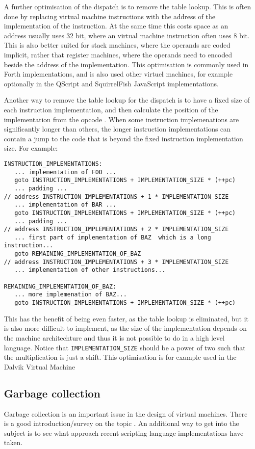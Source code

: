 \documentclass[11pt]{report}
\begin{document}
A further optimisation of the dispatch is to remove the table lookup. This is often done by replacing virtual machine instructions with the address of the implementation of the instruction. At the same time this costs space as an address usually uses 32 bit, where an virtual machine instruction often uses 8 bit. This is also better suited for stack machines, where the operands are coded implicit, rather that register machines, where the operands need to encoded beside the address of the implementation. This optimisation is commonly used in Forth implementations, and is also used other virtuel machines, for example optionally in the QScript \cite{qscript} and SquirrelFish \cite{webkit-source} JavaScript implementations.

Another way to remove the table lookup for the dispatch is to have a fixed size of each instruction implementation, and then calculate the position of the implementation from the opcode \cite{dalvik-talk}. When some instruction implemenations are significantly longer than others, the longer instruction implementations can contain a jump to the code that is beyond the fixed instruction implementation size.
For example:
\begin{verbatim}
INSTRUCTION_IMPLEMENTATIONS:
   ... implementation of FOO ...
   goto INSTRUCTION_IMPLEMENTATIONS + IMPLEMENTATION_SIZE * (++pc)
   ... padding ...
// address INSTRUCTION_IMPLEMENTATIONS + 1 * IMPLEMENTATION_SIZE
   ... implementation of BAR ...
   goto INSTRUCTION_IMPLEMENTATIONS + IMPLEMENTATION_SIZE * (++pc)
   ... padding ...
// address INSTRUCTION_IMPLEMENTATIONS + 2 * IMPLEMENTATION_SIZE
   ... first part of implementation of BAZ  which is a long instruction...
   goto REMAINING_IMPLEMENTATION_OF_BAZ
// address INSTRUCTION_IMPLEMENTATIONS + 3 * IMPLEMENTATION_SIZE
   ... implementation of other instructions...

REMAINING_IMPLEMENTATION_OF_BAZ:
   ... more implemenation of BAZ...
   goto INSTRUCTION_IMPLEMENTATIONS + IMPLEMENTATION_SIZE * (++pc)
\end{verbatim}
This has the benefit of being even faster, as the table lookup is eliminated,
but it is also more difficult to implement, 
as the size of the implementation depends on the machine architechture
and thus it is not possible to do in a high level language.
Notice that \verb|IMPLEMENTATION_SIZE| should be a power of two such that the multiplication is just a shift.
This optimisation is for example used in the Dalvik Virtual Machine \cite{dalvik-vm}


\subsection{Garbage collection}
Garbage collection is an important issue in the design of virtual machines.
There is a good introduction/survey on the topic \cite{gc-survey}.
An additional way to get into the subject is to see what approach recent scripting language implementations have taken.
\end{document}

